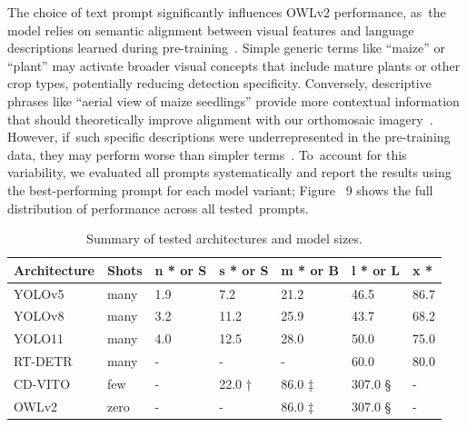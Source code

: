 \documentclass[12pt,a4paper,oneside]{report}
\begin{document}
The choice of text prompt significantly influences OWLv2 performance, as~the model 
relies on semantic alignment between visual features and language descriptions 
learned during pre-training~\cite{zhu_harnessing_2024}. Simple generic terms like ``maize'' or ``plant'' may 
activate broader visual concepts that include mature plants or other crop types, 
potentially reducing detection specificity. Conversely, descriptive phrases like 
``aerial view of maize seedlings'' provide more contextual information that should 
theoretically improve alignment with our orthomosaic imagery~\cite{s24186109}. However, if~such 
specific descriptions were underrepresented in the pre-training data, they may 
perform worse than simpler terms~\cite{chen_taskclip_2024}. To~account for this variability, we evaluated 
all prompts systematically and report the results using the best-performing prompt 
for each model variant; Figure%
~9 shows 
the full distribution of performance across all tested~prompts.


\begin{table}[H]
  \caption{Summary of tested architectures and model sizes.}
  \label{tab:architectures}
  \begin{tabularx}{\textwidth}{lXXXXXX}
  \toprule
  \textbf{Architecture} &\textbf{Shots} & \textbf{n * or S} & \textbf{s * or S} & \textbf{m * or B} & \textbf{l * or L} & \textbf{x *} \\
  \midrule
  YOLOv5 & many & 1.9 & 7.2 & 21.2 & 46.5 & 86.7 \\
  YOLOv8 & many & 3.2 & 11.2 & 25.9 & 43.7 & 68.2 \\
  YOLO11 & many & 4.0 & 12.5 & 28.0 & 50.0 & 75.0 \\
  RT-DETR & many & - & - & - & 60.0 & 80.0 \\
  CD-VITO & few & - & 22.0 † & 86.0 ‡ & 307.0 § & - \\
  OWLv2 & zero & - & - & 86.0 ‡ & 307.0 § & - \\
  \bottomrule
  \end{tabularx}
\end{table}
\unskip
\end{document}
